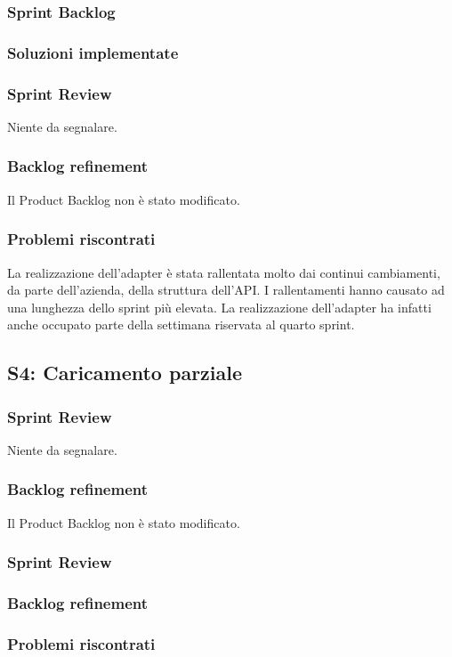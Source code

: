 \subsubsection{Sprint Backlog}
\subsubsection{Soluzioni implementate}
\subsubsection{Sprint Review}
Niente da segnalare.

\subsubsection{Backlog refinement}
Il Product Backlog non è stato modificato.

\subsubsection{Problemi riscontrati}
La realizzazione dell'adapter è stata rallentata molto dai continui cambiamenti, da parte dell'azienda, della struttura dell'API. I rallentamenti hanno causato ad una lunghezza dello sprint più elevata. La realizzazione dell'adapter ha infatti anche occupato parte della settimana riservata al quarto sprint.

\subsection{S4: Caricamento parziale}
\subsubsection{Sprint Review}
Niente da segnalare.

\subsubsection{Backlog refinement}
Il Product Backlog non è stato modificato.

\subsubsection{Sprint Review}
\subsubsection{Backlog refinement}
\subsubsection{Problemi riscontrati}

